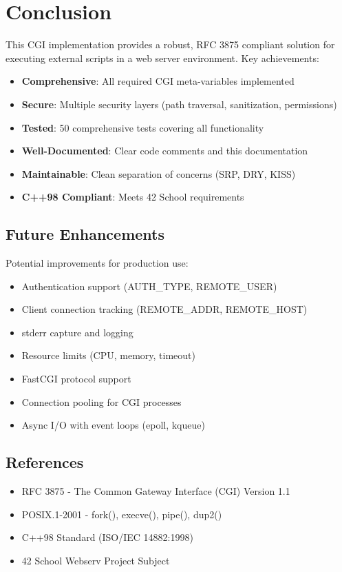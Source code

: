 \documentclass[11pt,a4paper]{article}
\begin{document}
\newpage
\section{Conclusion}

This CGI implementation provides a robust, RFC 3875 compliant solution for executing external scripts in a web server environment. Key achievements:

\begin{itemize}
    \item \textbf{Comprehensive}: All required CGI meta-variables implemented
    \item \textbf{Secure}: Multiple security layers (path traversal, sanitization, permissions)
    \item \textbf{Tested}: 50 comprehensive tests covering all functionality
    \item \textbf{Well-Documented}: Clear code comments and this documentation
    \item \textbf{Maintainable}: Clean separation of concerns (SRP, DRY, KISS)
    \item \textbf{C++98 Compliant}: Meets 42 School requirements
\end{itemize}

\subsection{Future Enhancements}

Potential improvements for production use:

\begin{itemize}
    \item Authentication support (AUTH\_TYPE, REMOTE\_USER)
    \item Client connection tracking (REMOTE\_ADDR, REMOTE\_HOST)
    \item stderr capture and logging
    \item Resource limits (CPU, memory, timeout)
    \item FastCGI protocol support
    \item Connection pooling for CGI processes
    \item Async I/O with event loops (epoll, kqueue)
\end{itemize}

\subsection{References}

\begin{itemize}
    \item RFC 3875 - The Common Gateway Interface (CGI) Version 1.1
    \item POSIX.1-2001 - fork(), execve(), pipe(), dup2()
    \item C++98 Standard (ISO/IEC 14882:1998)
    \item 42 School Webserv Project Subject
\end{itemize}
\end{document}
